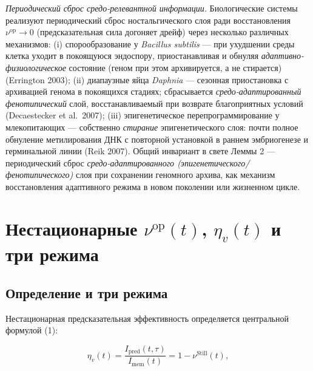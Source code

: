 \documentclass[pdflatex,sn-mathphys-ay]{sn-jnl}
\begin{document}
\emph{Периодический сброс средо-релевантной информации.} Биологические системы реализуют периодический сброс ностальгического слоя ради восстановления \(\nu^{\text{op}} \to 0\) (предсказательная сила догоняет дрейф) через несколько различных механизмов: (i) спорообразование у \emph{Bacillus subtilis} --- при ухудшении среды клетка уходит в покоящуюся эндоспору, приостанавливая и обнуляя \emph{адаптивно-физиологическое} состояние (геном при этом архивируется, а не стирается) (Errington 2003); (ii) диапаузные яйца \emph{Daphnia} --- сезонная приостановка с архивацией генома в покоящихся стадиях; сбрасывается \emph{средо-адаптированный фенотипический} слой, восстанавливаемый при возврате благоприятных условий (Decaestecker et al.~2007); (iii) эпигенетическое перепрограммирование у млекопитающих --- собственно \emph{стирание} эпигенетического слоя: почти полное обнуление метилирования ДНК с повторной установкой в раннем эмбриогенезе и герминальной линии (Reik 2007). Общий инвариант в свете Леммы 2 --- периодический сброс \emph{средо-адаптированного (эпигенетического/фенотипического)} слоя при сохранении геномного архива, как механизм восстановления адаптивного режима в новом поколении или жизненном цикле.



\section{\texorpdfstring{Нестационарные \(\nu^{\text{op}}(t)\), \(\eta_v(t)\) и три режима}{Нестационарные \textbackslash nu\^{}\{\textbackslash text\{op\}\}(t), \textbackslash eta\_v(t) и три режима}}\label{ux43dux435ux441ux442ux430ux446ux438ux43eux43dux430ux440ux43dux44bux435-nutextopt-eta_vt-ux438-ux442ux440ux438-ux440ux435ux436ux438ux43cux430}



\subsection{Определение и три режима}\label{ux43eux43fux440ux435ux434ux435ux43bux435ux43dux438ux435-ux438-ux442ux440ux438-ux440ux435ux436ux438ux43cux430}



Нестационарная предсказательная эффективность определяется центральной формулой (1):



\begin{equation}\eta_v(t) = \frac{I_{\text{pred}}(t, \tau)}{I_{\text{mem}}(t)} = 1 - \nu^{\text{Still}}(t), \tag{10}\end{equation}
\end{document}
